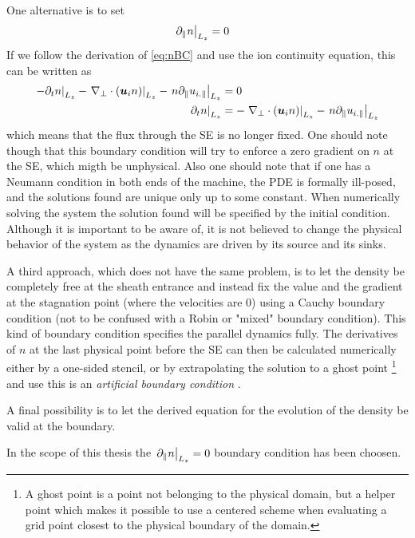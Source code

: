 One alternative is to set
%
\begin{align*}
    \left. \partial_\| n \right|_{L_z} &= 0
\end{align*}
%
If we follow the derivation of \cref{eq:nBC} and use the ion continuity equation, this can be written as
%
\begin{align*}
    \left.- \partial_tn \right|_{L_z}- \left.\nabla_\perp\cdot\left(\boldsymbol{u}_{i} n \right)\right|_{L_z}
    -\left.n \partial_\| u_{i.\|}\right|_{L_z}
    &= 0\\
    \left.\partial_tn \right|_{L_z}&=  - \left.\nabla_\perp\cdot\left(\boldsymbol{u}_{i} n \right)\right|_{L_z}-
    \left.n \partial_\| u_{i.\|}\right|_{L_z}
\end{align*}
%
which means that the flux through the SE is no longer fixed.
One should note though that this boundary condition will try to enforce a zero gradient on $n$ at the SE, which migth be unphysical.
Also one should note that if one has a Neumann condition in both ends of the machine, the PDE is formally ill-posed, and the solutions found are unique only up to some constant.
When numerically solving the system the solution found will be specified by the initial condition.
Although it is important to be aware of, it is not believed to change the physical behavior of the system as the dynamics are driven by its source and its sinks.

A third approach, which does not have the same problem, is to let the density be completely free at the sheath entrance and instead fix the value and the gradient at the stagnation point (where the velocities are $0$) using a Cauchy boundary condition (not to be confused with a Robin or "mixed" boundary condition).
This kind of boundary condition specifies the parallel dynamics fully.
The derivatives of $n$ at the last physical point before the SE can then be calculated numerically either by a one-sided stencil, or by extrapolating the solution to a ghost point%
%
\footnote{A ghost point is a point not belonging to the physical domain, but a helper point which makes it possible to use a centered scheme when evaluating a grid point closest to the physical boundary of the domain.}
%
and use this is an \emph{artificial boundary condition} \cite{Leveque2007book}.

A final possibility is to let the derived equation for the evolution of the density be valid at the boundary.

In the scope of this thesis the $\left. \partial_\| n \right|_{L_z} = 0$ boundary condition has been choosen.

